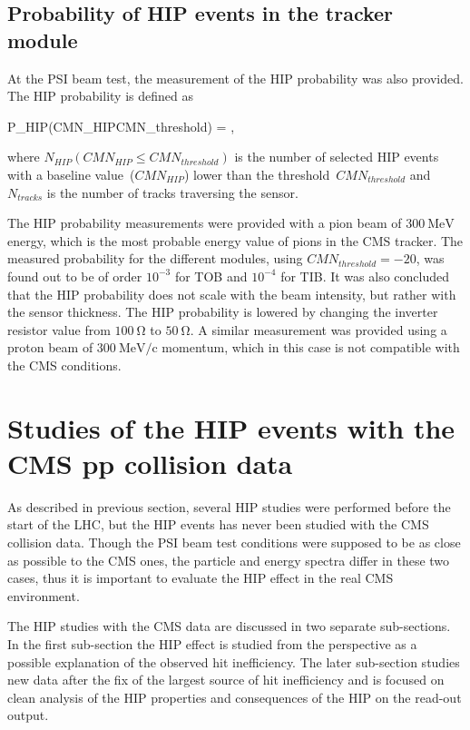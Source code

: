\subsection{Probability of HIP events in the tracker module~\label{sec:ProbPast}}

At the PSI beam test, the measurement of the HIP probability was also provided. The HIP probability is defined as 

{
P_{HIP}(CMN_{HIP}\leq CMN_{threshold}) = ,
}

where $N_{HIP}(CMN_{HIP}\leq CMN_{threshold})$ is the number of selected HIP events with a baseline value~($CMN_{HIP}$) lower than the threshold~$CMN_{threshold}$ and $N_{tracks}$ is the number of tracks traversing the sensor.

The HIP probability measurements were provided with a pion beam of $300~\mathrm{MeV}$ energy, which is the most probable energy value of pions in the CMS tracker. The measured probability for the different modules, using $CMN_{threshold}=-20$, was found out to be of order $10^{-3}$ for TOB and $10^{-4}$ for TIB. It was also concluded that the HIP probability does not scale with the beam intensity, but rather with the sensor thickness. The HIP probability is lowered by changing the inverter resistor value from $100~\mathrm{\Omega}$ to  $50~\mathrm{\Omega}$. A similar measurement was provided using a proton beam of  $300~\mathrm{MeV/c}$ momentum, which in this case is not compatible with the CMS conditions.


\section{Studies of the HIP events with the CMS pp collision data}

As described in previous section, several HIP studies were performed before the start of the LHC, but the HIP events has never been studied with the CMS collision data. Though the PSI beam test conditions were supposed to be as close as possible to the CMS ones, the particle and energy spectra differ in these two cases, thus it is important to evaluate the HIP effect in the real CMS environment.

The HIP studies with the CMS data are discussed in two separate sub-sections. In the first sub-section the HIP effect is studied from the perspective as a possible explanation of the observed hit inefficiency. The later sub-section studies new data after the fix of the largest source of hit inefficiency and is focused on clean analysis of the HIP properties and consequences of the HIP on the read-out output.

